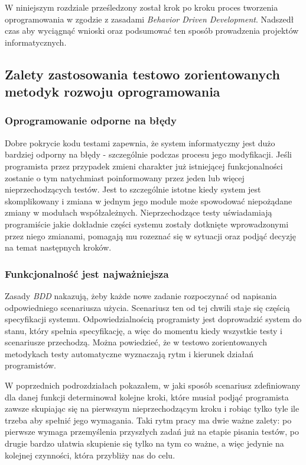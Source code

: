   W niniejszym rozdziale prześledzony został krok po kroku proces tworzenia oprogramowania w zgodzie z zasadami \emph{Behavior Driven Development}. Nadszedł czas aby wyciągnąć wnioski oraz podsumować ten sposób prowadzenia projektów informatycznych.
  
  \subsection{Zalety zastosowania testowo zorientowanych metodyk rozwoju oprogramowania}
  
  \subsubsection{Oprogramowanie odporne na błędy}
    Dobre pokrycie kodu testami zapewnia, że system informatyczny jest dużo bardziej odporny na błędy - szczególnie podczas procesu jego modyfikacji. Jeśli programista przez przypadek zmieni charakter już istniejącej funkcjonalności zostanie o tym natychmiast poinformowany przez jeden lub więcej nieprzechodzących testów. Jest to szczególnie istotne kiedy system jest skomplikowany i zmiana w jednym jego module może spowodować niepożądane zmiany w modułach współzależnych. Nieprzechodzące testy uświadamiają programiście jakie dokładnie części systemu zostały dotknięte wprowadzonymi przez niego zmianami, pomagają mu rozeznać się w sytuacji oraz podjąć decyzję na temat następnych kroków.
    
  \subsubsection{Funkcjonalność jest najważniejsza}
  Zasady \emph{BDD} nakazują, żeby każde nowe zadanie rozpoczynać od napisania odpowiedniego scenariusza użycia. Scenariusz ten od tej chwili staje się częścią specyfikacji systemu. Odpowiedzialnością programisty jest doprowadzić system do stanu, który spełnia specyfikację, a więc do momentu kiedy wszystkie testy i scenariusze przechodzą. Można powiedzieć, że w testowo zorientowanych metodykach testy automatyczne wyznaczają rytm i kierunek działań programistów. 
    
  W poprzednich podrozdziałach pokazałem, w jaki sposób scenariusz zdefiniowany dla danej funkcji determinował kolejne kroki, które musiał podjąć programista zawsze skupiając się na pierwszym nieprzechodzącym kroku i robiąc tylko tyle ile trzeba aby spełnić jego wymagania. Taki rytm pracy ma dwie ważne zalety: po pierwsze wymaga przemyślenia przyszłych zadań już na etapie pisania testów, po drugie bardzo ułatwia skupienie się tylko na tym co ważne, a więc jedynie na kolejnej czynności, która przybliży nas do celu.
    
